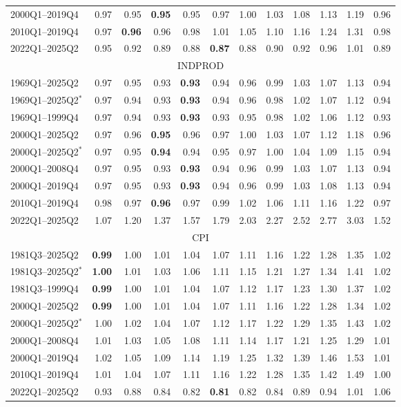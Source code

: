 \begin{tabular}{lrrrrrrrrrrr}
2000Q1--2019Q4 & 0.97 & 0.95 & \textbf{0.95} & 0.95 & 0.97 & 1.00 & 1.03 & 1.08 & 1.13 & 1.19 & 0.96 \\
2010Q1--2019Q4 & 0.97 & \textbf{0.96} & 0.96 & 0.98 & 1.01 & 1.05 & 1.10 & 1.16 & 1.24 & 1.31 & 0.98 \\
2022Q1--2025Q2 & 0.95 & 0.92 & 0.89 & 0.88 & \textbf{0.87} & 0.88 & 0.90 & 0.92 & 0.96 & 1.01 & 0.89 \\
\hline
\multicolumn{12}{c}{INDPROD} \\
1969Q1--2025Q2 & 0.97 & 0.95 & 0.93 & \textbf{0.93} & 0.94 & 0.96 & 0.99 & 1.03 & 1.07 & 1.13 & 0.94 \\
1969Q1--2025Q2$^*$ & 0.97 & 0.94 & 0.93 & \textbf{0.93} & 0.94 & 0.96 & 0.98 & 1.02 & 1.07 & 1.12 & 0.94 \\
1969Q1--1999Q4 & 0.97 & 0.94 & 0.93 & \textbf{0.93} & 0.93 & 0.95 & 0.98 & 1.02 & 1.06 & 1.12 & 0.93 \\
2000Q1--2025Q2 & 0.97 & 0.96 & \textbf{0.95} & 0.96 & 0.97 & 1.00 & 1.03 & 1.07 & 1.12 & 1.18 & 0.96 \\
2000Q1--2025Q2$^*$ & 0.97 & 0.95 & \textbf{0.94} & 0.94 & 0.95 & 0.97 & 1.00 & 1.04 & 1.09 & 1.15 & 0.94 \\
2000Q1--2008Q4 & 0.97 & 0.95 & 0.93 & \textbf{0.93} & 0.94 & 0.96 & 0.99 & 1.03 & 1.07 & 1.13 & 0.94 \\
2000Q1--2019Q4 & 0.97 & 0.95 & 0.93 & \textbf{0.93} & 0.94 & 0.96 & 0.99 & 1.03 & 1.08 & 1.13 & 0.94 \\
2010Q1--2019Q4 & 0.98 & 0.97 & \textbf{0.96} & 0.97 & 0.99 & 1.02 & 1.06 & 1.11 & 1.16 & 1.22 & 0.97 \\
2022Q1--2025Q2 & 1.07 & 1.20 & 1.37 & 1.57 & 1.79 & 2.03 & 2.27 & 2.52 & 2.77 & 3.03 & 1.52 \\
\hline
\multicolumn{12}{c}{CPI} \\
1981Q3--2025Q2 & \textbf{0.99} & 1.00 & 1.01 & 1.04 & 1.07 & 1.11 & 1.16 & 1.22 & 1.28 & 1.35 & 1.02 \\
1981Q3--2025Q2$^*$ & \textbf{1.00} & 1.01 & 1.03 & 1.06 & 1.11 & 1.15 & 1.21 & 1.27 & 1.34 & 1.41 & 1.02 \\
1981Q3--1999Q4 & \textbf{0.99} & 1.00 & 1.01 & 1.04 & 1.07 & 1.12 & 1.17 & 1.23 & 1.30 & 1.37 & 1.02 \\
2000Q1--2025Q2 & \textbf{0.99} & 1.00 & 1.01 & 1.04 & 1.07 & 1.11 & 1.16 & 1.22 & 1.28 & 1.34 & 1.02 \\
2000Q1--2025Q2$^*$ & 1.00 & 1.02 & 1.04 & 1.07 & 1.12 & 1.17 & 1.22 & 1.29 & 1.35 & 1.43 & 1.02 \\
2000Q1--2008Q4 & 1.01 & 1.03 & 1.05 & 1.08 & 1.11 & 1.14 & 1.17 & 1.21 & 1.25 & 1.29 & 1.01 \\
2000Q1--2019Q4 & 1.02 & 1.05 & 1.09 & 1.14 & 1.19 & 1.25 & 1.32 & 1.39 & 1.46 & 1.53 & 1.01 \\
2010Q1--2019Q4 & 1.01 & 1.04 & 1.07 & 1.11 & 1.16 & 1.22 & 1.28 & 1.35 & 1.42 & 1.49 & 1.00 \\
2022Q1--2025Q2 & 0.93 & 0.88 & 0.84 & 0.82 & \textbf{0.81} & 0.82 & 0.84 & 0.89 & 0.94 & 1.01 & 1.06 \\
\hline
\end{tabular}
